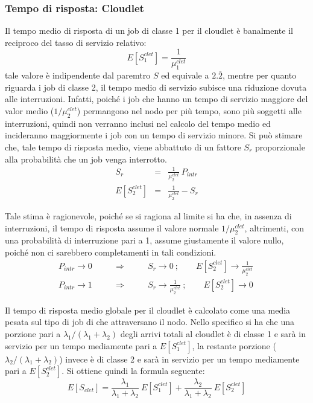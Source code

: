 \subsubsection{Tempo di risposta: Cloudlet}
Il tempo medio di risposta di un job di classe 1 per il cloudlet è banalmente il
reciproco del tasso di servizio relativo:
\begin{equation}
E[S_1^{clet}] = \frac{1}{\mu_1^{clet}}
\end{equation}
tale valore è indipendente dal paremtro $S$ ed equivale a $2.\overline2$, mentre
per quanto riguarda i job di classe 2, il tempo medio di servizio subisce una
riduzione dovuta alle interruzioni. Infatti, poiché i job che hanno un tempo
di servizio maggiore del valor medio ($1/\mu_2^{clet}$) permangono nel nodo per
più tempo, sono più soggetti alle interruzioni, quindi
non verranno inclusi nel calcolo del tempo medio ed incideranno maggiormente i
job con un tempo di servizio minore.
Si può stimare che, tale tempo di risposta medio, viene abbattuto di un fattore
$S_r$ proporzionale alla probabilità che un job venga interrotto.
\begin{eqnarray}
S_r &=& \frac{1}{\mu_2^{clet}} \ P_{intr}  \nonumber \\
E[S_2^{clet}] &=& \frac{1}{\mu_2^{clet}} - S_r
\end{eqnarray}

Tale stima è ragionevole, poiché se si ragiona al limite si ha che, in assenza di
interruzioni, il tempo di risposta assume il valore normale $1/\mu_2^{clet}$,
altrimenti, con una probabilità di interruzione pari a 1, assume giustamente il
valore nullo, poiché non ci sarebbero completamenti in tali condizioni.
\begin{eqnarray*}
P_{intr} \longrightarrow 0 \qquad & \Rightarrow \qquad & 
S_r \rightarrow 0 \ ; \qquad E[S_2^{clet}] \rightarrow
\frac{1}{\mu_2^{clet}} \ \\
P_{intr} \longrightarrow 1 \qquad & \Rightarrow \qquad & 
S_r \rightarrow \frac{1}{\mu_2^{clet}} \ ; \qquad E[S_2^{clet}] \rightarrow 0
\end{eqnarray*}

Il tempo di risposta medio globale per il cloudlet è calcolato come una media
pesata sul tipo di job di che attraversano il nodo. Nello specifico si ha che
una porzione pari a $\lambda_1/(\lambda_1+\lambda_2)$ degli arrivi totali al
cloudlet è di classe 1 e sarà in servizio per un tempo mediamente pari a
$E[S_1^{clet}]$, la restante porzione ($\lambda_2/(\lambda_1+\lambda_2)$) invece
è di classe 2 e sarà in servizio per un tempo mediamente pari a $E[S_2^{clet}]$.
Si ottiene quindi la formula seguente:
\begin{equation}
E[S_{clet}] = 
\frac{\lambda_1}{\lambda_1+\lambda_2} \ E[S_1^{clet}] +
\frac{\lambda_2}{\lambda_1+\lambda_2} \ E[S_2^{clet}] 
\end{equation}
%
